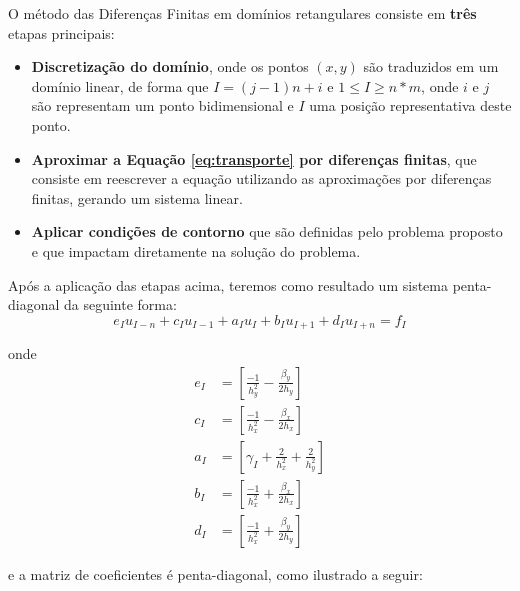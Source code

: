\documentclass[
	11pt,				%
	oneside,			%
	a4paper,			%
	english,			%
	brazil,				%
	]{article}
\begin{document}
O método das Diferenças Finitas em domínios retangulares consiste em 
\textbf{três} etapas principais:

\begin{itemize}
 \item \textbf{Discretização do domínio}, onde os pontos $(x,y)$ são traduzidos 
em um domínio linear, de forma que $I = (j-1)n + i$ e $ 1 \le I \ge n*m$, onde 
$i$ e $j$ são representam um ponto bidimensional e $I$ uma posição 
representativa deste ponto.
 \item \textbf{Aproximar a Equação \eqref{eq:transporte} por diferenças 
finitas}, que consiste em reescrever a equação utilizando as aproximações por 
diferenças finitas, gerando um sistema linear.
 \item \textbf{Aplicar condições de contorno} que são definidas pelo problema 
proposto e que impactam diretamente na solução do problema.
\end{itemize}

Após a aplicação das etapas acima, teremos como resultado um sistema 
penta-diagonal da seguinte forma:
\begin{equation} \label{eq:discret}
e_Iu_{I-n} + c_Iu_{I-1} + a_Iu_I + b_Iu_{I+1} + d_Iu_{I+n} = f_I
\end{equation}

\noindent onde
\begin{align*}
e_I &= \left[\frac{-1}{h^2_y} - \frac{\beta_y}{2h_y}\right]  \\
c_I &= \left[\frac{-1}{h^2_x} - \frac{\beta_x}{2h_x}\right]  \\
a_I &= \left[\gamma_I + \frac{2}{h^2_x} + \frac{2}{h^2_y}\right]  \\
b_I &= \left[\frac{-1}{h^2_x} + \frac{\beta_x}{2h_x}\right]  \\
d_I &= \left[\frac{-1}{h^2_x} + \frac{\beta_y}{2h_y}\right]
\end{align*}

\noindent e a matriz de coeficientes é penta-diagonal, como ilustrado a seguir:
\end{document}
